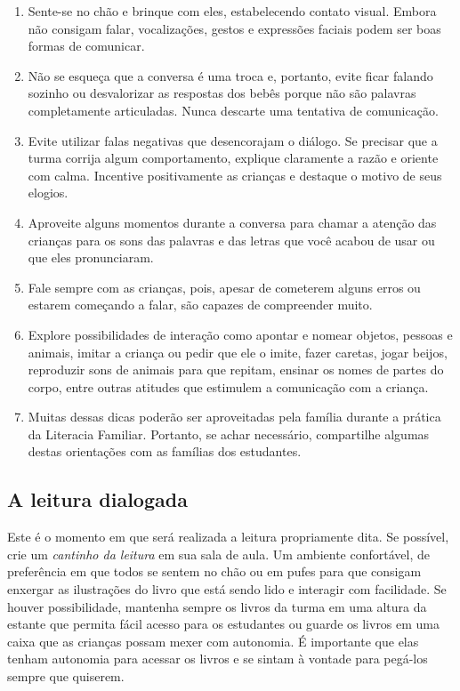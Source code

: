 \documentclass[11pt]{extarticle}
\begin{document}
\begin{enumerate}
\item Sente-se no chão e brinque com eles, estabelecendo 
contato visual. Embora não consigam falar, vocalizações, 
gestos e expressões faciais podem ser boas formas de comunicar.

\item Não se esqueça que a conversa é uma troca e, portanto, 
evite ficar falando sozinho ou desvalorizar as respostas dos 
bebês porque não são palavras completamente articuladas. 
Nunca descarte uma tentativa de comunicação. 

\item Evite utilizar falas negativas que desencorajam o diálogo. 
Se precisar que a turma corrija algum comportamento, explique 
claramente a razão e oriente com calma. Incentive positivamente 
as crianças e destaque o motivo de seus elogios. 

\item Aproveite alguns momentos durante a conversa para chamar 
a atenção das crianças para os sons das palavras e das letras que você 
acabou de usar ou que eles pronunciaram.  

\item Fale sempre com as crianças, pois, apesar de cometerem alguns erros
ou estarem começando a falar, são capazes de compreender muito.

\item Explore possibilidades de interação como apontar e 
nomear objetos, pessoas e animais, imitar a criança ou pedir que 
ele o imite, fazer caretas, jogar beijos, reproduzir sons de 
animais para que repitam, ensinar os nomes de partes do corpo, 
entre outras atitudes que estimulem a comunicação com a criança. 

\item Muitas dessas dicas poderão ser aproveitadas pela 
família durante a prática da Literacia Familiar. Portanto, 
se achar necessário, compartilhe algumas destas orientações 
com as famílias dos estudantes.
\end{enumerate}


\subsection{A leitura dialogada}
Este é o momento em que será realizada a leitura propriamente dita. 
Se possível, crie um \textit{cantinho da leitura} em sua sala de aula. Um 
ambiente confortável, de preferência em que todos se sentem no chão ou 
em pufes para que consigam enxergar as ilustrações do livro que está 
sendo lido e interagir com facilidade. Se houver possibilidade, mantenha 
sempre os livros da turma em uma altura da estante que permita fácil 
acesso para os estudantes ou guarde os livros em uma caixa que as crianças 
possam mexer com autonomia. É importante que elas tenham autonomia para 
acessar os livros e se sintam à vontade para pegá-los sempre que quiserem. 
\end{document}
